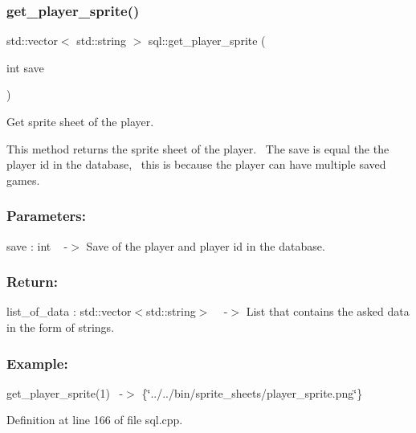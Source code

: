 \subsubsection{\texorpdfstring{get\+\_\+player\+\_\+sprite()}{get\_player\_sprite()}}
{\footnotesize\ttfamily std\+::vector$<$ std\+::string $>$ sql\+::get\+\_\+player\+\_\+sprite (\begin{DoxyParamCaption}\item[{int}]{save }\end{DoxyParamCaption})}



Get sprite sheet of the player. 

This method returns the sprite sheet of the player.~\newline
The save is equal the the player id in the database,~\newline
this is because the player can have multiple saved games.~\newline


\subsubsection*{Parameters\+: }

save \+: int ~\newline
-\/$>$ Save of the player and player id in the database.

\subsubsection*{Return\+: }

list\+\_\+of\+\_\+data \+: std\+::vector$<$std\+::string$>$ ~\newline
-\/$>$ List that contains the asked data in the form of strings.

\subsubsection*{Example\+: }

get\+\_\+player\+\_\+sprite(1)~\newline
-\/$>$ \{\char`\"{}../../bin/sprite\+\_\+sheets/player\+\_\+sprite.\+png\char`\"{}\} 

Definition at line 166 of file sql.\+cpp.


